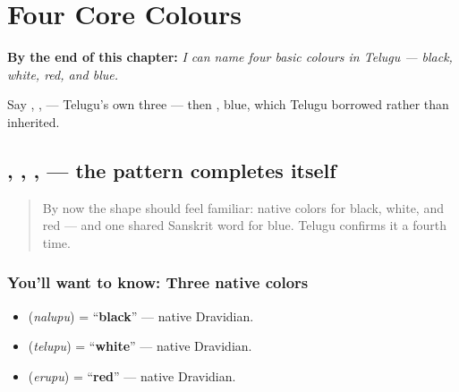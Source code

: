 
\chapter{Four Core Colours}
\label{ch:te-core-colours}

\begin{chapteropening}
\textbf{By the end of this chapter:} \emph{I can name four basic colours in Telugu — black, white, red, and blue.}

Say , ,  — Telugu's own three — then , blue, which Telugu borrowed rather than inherited.
\end{chapteropening}

\section[\texorpdfstring{\te{నలుపు} \te{తెలుపు} … (nalupu telupu …)}{నలుపు తెలుపు … (nalupu telupu …)}]{, , ,  — the pattern completes itself}

\label{lesson:TE-C11-rangulu}



\begin{quote}
By now the shape should feel familiar: native colors for black, white, and red — and one shared Sanskrit word for blue. Telugu confirms it a fourth time.
\end{quote}

\subsection*{You'll want to know: Three native colors}
\begin{itemize}
\raggedright
  \item \textbf{} (\emph{nalupu}) = \textquotedblleft{}\textbf{black}\textquotedblright{} — native Dravidian.
  \item \textbf{} (\emph{telupu}) = \textquotedblleft{}\textbf{white}\textquotedblright{} — native Dravidian.
  \item \textbf{} (\emph{erupu}) = \textquotedblleft{}\textbf{red}\textquotedblright{} — native Dravidian.
\end{itemize}

